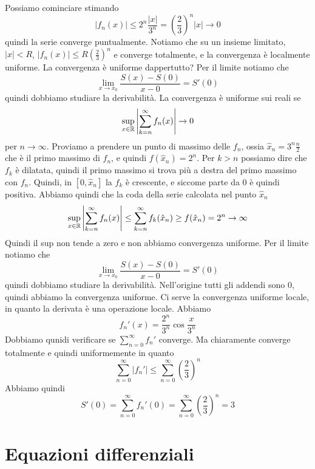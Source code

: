 \documentclass[a4paper]{article}
\begin{document}
\begin{snippetsolution}{}
    Possiamo cominciare stimando
    \[
        |f_n(x)| \leq 2^n\frac{|x|}{3^n} = \left(\frac23\right)^n |x| \to 0
    \]
    quindi la serie converge puntualmente.
    Notiamo che su un insieme limitato, \(|x| < R\),
    \(|f_n(x)| \leq R \left(\frac23\right)^n\)
    e converge totalmente, e la convergenza è localmente uniforme.
    La convergenza è uniforme dappertutto?
    Per il limite notiamo che
    \[
        \lim_{x \to x_0} \frac{S(x) - S(0)}{x-0} = S'(0)
    \]
    quindi dobbiamo studiare la derivabilità.
    La convergenza è uniforme sui reali se 
    \[
        \sup_{x\in \mathbb{R}} \left|
            \sum_{k=n}^\infty f_n(x)
        \right| \to 0
    \]
    per \(n \to \infty\).
    Proviamo a prendere un punto di massimo delle \(f_n\),
    ossia \(\hat x_n = 3^n\frac{n}{2}\) che è il primo massimo di \(f_n\),
    e quindi \(f(\hat x_n) = 2^n\).
    Per \(k > n\) possiamo dire che
    \(f_k\) è dilatata, quindi il primo massimo si trova più a destra del primo massimo con
    \(f_n\). Quindi, in \([0, \hat x_n]\) la \(f_k\) è crescente,
    e siccome parte da 0 è quindi positiva.
    Abbiamo quindi che la coda della serie calcolata nel punto \(\hat x_n\)
    \[
        \sup_{x\in \mathbb{R}} \left|
            \sum_{k=n}^\infty f_n(x)
        \right| \leq \sum_{k=n}^\infty f_k(\hat x_n) \geq f(\hat x_n) = 2^n \to \infty
    \]
    Quindi il sup non tende a zero e non abbiamo convergenza uniforme.
    Per il limite notiamo che
    \[
        \lim_{x \to x_0} \frac{S(x) - S(0)}{x-0} = S'(0)
    \]
    quindi dobbiamo studiare la derivabilità.
    Nell'origine tutti gli addendi sono \(0\),
    quindi abbiamo la convergenza uniforme.
    Ci serve la convergenza uniforme locale, in quanto la derivata è una operazione locale.
    Abbiamo
    \[
        f_n'(x) = \frac{2^n}{3^n} \cos \frac{x}{3^n}
    \]
    Dobbiamo qunidi verificare se
    \(\sum_{n=0}^\infty f_n'\) converge. Ma chiaramente converge totalmente e quindi uniformemente in quanto
    \[
        \sum_{n=0}^\infty |f_n'| \leq \sum_{n=0}^\infty \left(\frac{2}{3}\right)^n
    \]
    Abbiamo quindi
    \[
        S'(0) = \sum_{n=0}^\infty f_n'(0) = \sum_{n=0}^\infty \left(\frac{2}{3}\right)^n = 3
    \]
\end{snippetsolution}

\pagebreak

\section{Equazioni differenziali}
\end{document}
